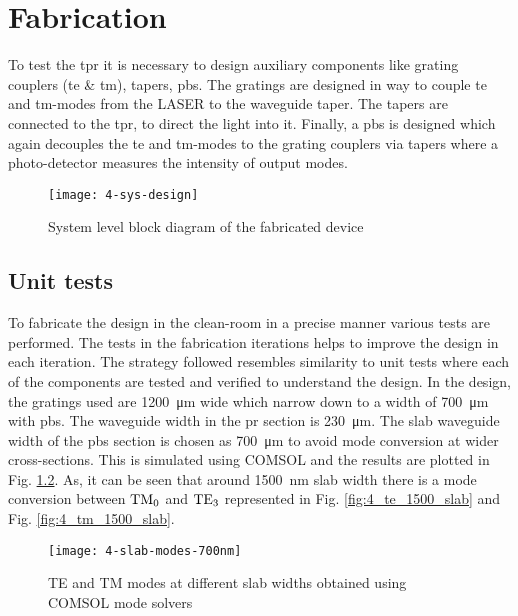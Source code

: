 \documentclass[../report.tex]{subfiles}
\begin{document}
	
	
\chapter{Fabrication}
To test the \gls{tpr} it is necessary to design auxiliary components like grating couplers (\gls{te} \& \gls{tm}), tapers, \gls{pbs}. The gratings are designed in way to couple \gls{te} and \gls{tm}-modes from the LASER to the waveguide taper. The tapers are connected to the \gls{tpr}, to direct the light into it. Finally, a \gls{pbs} is designed which again decouples the \gls{te} and \gls{tm}-modes to the grating couplers via tapers where a photo-detector measures the intensity of output modes.  

\begin{figure}[H] %
	\centering
	\texttt{[image: 4-sys-design]}
	\caption{System level block diagram of the fabricated device}
	\label{fig:4_sys_design}
\end{figure}

\section{Unit tests}
To fabricate the design in the clean-room in a precise manner various tests are performed. The tests in the fabrication iterations helps to improve the design in each iteration. The strategy followed resembles similarity to unit tests where each of the components are tested and verified to understand the design. In the design, the gratings used are \SI{1200}{\micro\meter} wide which narrow down to a width of \SI{700}{\micro\meter} with \gls{pbs}. The waveguide width in the \gls{pr} section is \SI{230}{\micro\meter}. The slab waveguide width of the \gls{pbs} section is chosen as \SI{700}{\micro\meter} to avoid mode conversion at wider cross-sections. This is simulated using COMSOL and the results are plotted in Fig. \ref{fig:4_slab_modes_700nm}. As, it can be seen that around \SI{1500}{\nano\meter} slab width there is a mode conversion between $\mathrm{TM_0}$ and $\mathrm{TE_3}$ represented in Fig. \ref{fig:4_te_1500_slab} and Fig. \ref{fig:4_tm_1500_slab}. 

\begin{figure}[H] %
	\centering
	\texttt{[image: 4-slab-modes-700nm]}
	\caption{TE and TM modes at different slab widths obtained using COMSOL mode solvers}
	\label{fig:4_slab_modes_700nm}
\end{figure}
\end{document}

